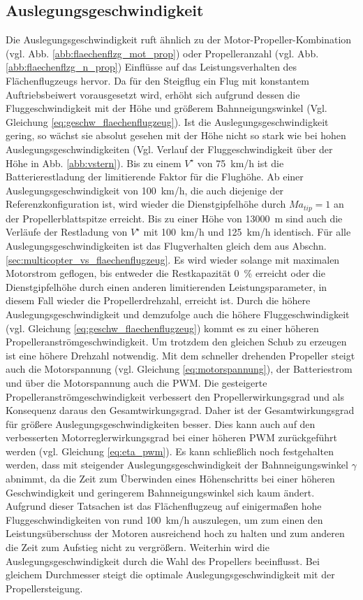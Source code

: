 \subsection{Auslegungsgeschwindigkeit}
\label{subsec:vstern}
Die Auslegungsgeschwindigkeit ruft ähnlich zu der Motor-Propeller-Kombination (vgl. Abb. \ref{abb:flaechenflzg_mot_prop}) oder Propelleranzahl (vgl. Abb. \ref{abb:flaechenflzg_n_prop}) Einflüsse auf das Leistungsverhalten des Flächenflugzeugs hervor. Da für den Steigflug ein Flug mit konstantem Auftriebsbeiwert vorausgesetzt wird, erhöht sich aufgrund dessen die Fluggeschwindigkeit mit der Höhe und größerem Bahnneigungswinkel (Vgl. Gleichung \ref{eq:geschw_flaechenflugzeug}).
Ist die Auslegungsgeschwindigkeit gering, so wächst sie absolut gesehen mit der Höhe nicht so stark wie bei hohen Auslegungsgeschwindigkeiten (Vgl. Verlauf der Fluggeschwindigkeit über der Höhe in Abb. \ref{abb:vstern}). 
Bis zu einem \ensuremath{V^\star} von \SI{75}{km/h} ist die Batterierestladung der limitierende Faktor für die Flughöhe. Ab einer Auslegungsgeschwindigkeit von \SI{100}{km/h}, die auch diejenige der Referenzkonfiguration ist, wird wieder die Dienstgipfelhöhe durch \ensuremath{Ma_{tip} = 1} an der Propellerblattspitze erreicht. Bis zu einer Höhe von \SI{13000}{m} sind auch die Verläufe der Restladung von \ensuremath{V^\star} mit \SI{100}{km/h} und \SI{125}{km/h} identisch. Für alle Auslegungsgeschwindigkeiten ist das Flugverhalten gleich dem aus Abschn. \ref{sec:multicopter_vs_flaechenflugzeug}. Es wird wieder solange mit maximalen Motorstrom geflogen, bis entweder die Restkapazität \SI{0}{\%} erreicht oder die Dienstgipfelhöhe durch einen anderen limitierenden Leistungsparameter, in diesem Fall wieder die Propellerdrehzahl, erreicht ist. Durch die höhere Auslegungsgeschwindigkeit und demzufolge auch die höhere Fluggeschwindigkeit (vgl. Gleichung \ref{eq:geschw_flaechenflugzeug}) kommt es zu einer höheren Propelleranströmgeschwindigkeit. Um trotzdem den gleichen Schub zu erzeugen ist eine höhere Drehzahl notwendig. Mit dem schneller drehenden Propeller steigt auch die Motorspannung (vgl. Gleichung \eqref{eq:motorspannung}), der Batteriestrom und über die Motorspannung auch die PWM. Die gesteigerte Propelleranströmgeschwindigkeit verbessert den Propellerwirkungsgrad und als Konsequenz daraus den Gesamtwirkungsgrad. Daher ist der Gesamtwirkungsgrad für größere Auslegungsgeschwindigkeiten besser. Dies kann auch auf den verbesserten Motorreglerwirkungsgrad bei einer höheren PWM zurückgeführt werden (vgl. Gleichung \ref{eq:eta_pwm}). Es kann schließlich noch festgehalten werden, dass mit steigender Auslegungsgeschwindigkeit der Bahnneigungswinkel \ensuremath{\gamma} abnimmt, da die Zeit zum Überwinden eines Höhenschritts bei einer höheren Geschwindigkeit und geringerem Bahnneigungswinkel sich kaum ändert. \\
Aufgrund dieser Tatsachen ist das Flächenflugzeug auf einigermaßen hohe Fluggeschwindigkeiten von rund \SI{100}{km/h} auszulegen, um zum einen den Leistungsüberschuss der Motoren ausreichend hoch zu halten und zum anderen die Zeit zum Aufstieg nicht zu vergrößern. Weiterhin wird die Auslegungsgeschwindigkeit durch die Wahl des Propellers beeinflusst. Bei gleichem Durchmesser steigt die optimale Auslegungsgeschwindigkeit mit der Propellersteigung.

